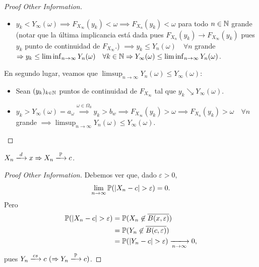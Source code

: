\begin{proof}[Proof Other Information]
\begin{itemize}
		\item $y_{k} < Y_{\infty}(\omega) \implies F_{X_{\infty}}(y_{k}) < \omega \implies F_{X_{n}}(y_{k}) < \omega$ para todo $n \in \mathbb{N}$ grande (notar que la última implicancia está dada pues $F_{X_{n}}(y_{k}) \longrightarrow F_{X_{\infty}}(y_{k})$ pues $y_{k}$ punto de continuidad de $F_{X_{\infty}}$.) $\implies y_{k} \leq Y_{n}(\omega) \quad \forall n$ grande $\Rightarrow y_{k} \leq \liminf_{n \to \infty} Y_{n}(\omega) \quad \forall k \in \mathbb{N} \Rightarrow Y_{\infty}(\omega) \leq \liminf_{n \to \infty} Y_{n}(\omega)$.
	\end{itemize}
	En segundo lugar, veamos que $\limsup_{n \to \infty} Y_{n}(\omega) \leq Y_{\infty}(\omega)$:
	\begin{itemize}
		\item Sean $(y_{k})_{k \in \mathbb{N}}$ puntos de continuidad de $F_{X_{\infty}}$ tal que $y_{k} \searrow Y_{\infty}(\omega)$.

		\item $y_{k} > Y_{\infty}(\omega) = a_{\omega} \stackrel{\omega \in \Omega_{0}}{\implies} y_{k} > b_{w} \implies F_{X_{\infty}}(y_{k}) > \omega \implies F_{X_{n}}(y_{k}) > \omega \quad \forall n$ grande $\implies \limsup_{n \to \infty} Y_{n}(\omega) \leq Y_{\infty}(\omega)$.
	\end{itemize}
\end{proof}

\begin{corollary}
	$X_{n} \xlongrightarrow{d} x \implies X_{n} \xlongrightarrow{\mbb{P}} c$.
\end{corollary}
\begin{proof}[Proof Other Information]
	Debemos ver que, dado $\varepsilon > 0$,
	\[ \lim_{n \to \infty} \mathbb{P}(|X_{n} - c| > \varepsilon) = 0. \]
	Pero 
	\begin{align*}
		\mbb{P}(|X_{n} - c| > \varepsilon) &= \mbb{P}(X_{n} \not\in \overline{B(x, \varepsilon)}) \\
		&= \mbb{P}(Y_{n} \not\in \overline{B(c,\varepsilon)}) \\
		&= \mbb{P}(|Y_{n} - c| > \varepsilon) \xlongrightarrow[n \to \infty]{} 0
	,\end{align*}
	pues $Y_{n} \xlongrightarrow{cs} c \ (\implies Y_{n} \xlongrightarrow{\mbb{P}} c)$.
\end{proof}

